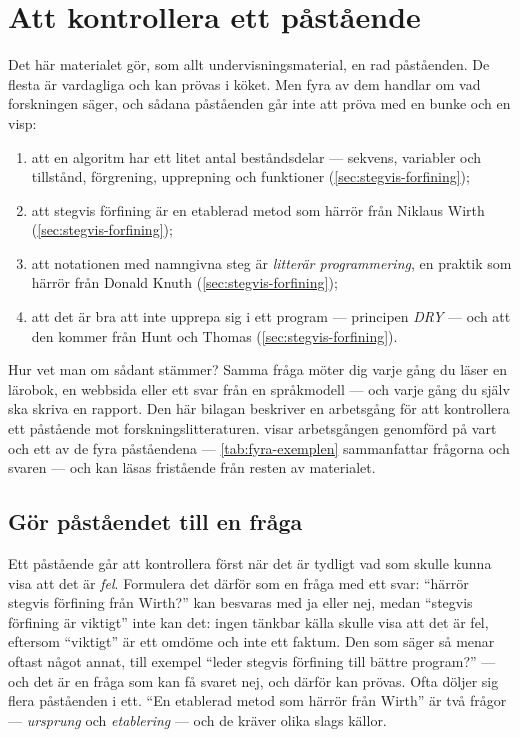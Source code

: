 \chapter{Att kontrollera ett påstående}
\label{app:verifiera-algoritmiskt}

Det här materialet gör, som allt undervisningsmaterial, en rad påståenden.
De flesta är vardagliga och kan prövas i köket.  Men fyra av dem handlar
om vad forskningen säger, och sådana påståenden går inte att pröva med en
bunke och en visp:
\begin{enumerate}
  \item att en algoritm har ett litet antal beståndsdelar --- sekvens,
    variabler och tillstånd, förgrening, upprepning och funktioner
    (\cref{sec:stegvis-forfining});
  \item att stegvis förfining är en etablerad metod som härrör från
    Niklaus Wirth (\cref{sec:stegvis-forfining});
  \item att notationen med namngivna steg är \emph{litterär
    programmering}, en praktik som härrör från Donald Knuth
    (\cref{sec:stegvis-forfining});
  \item att det är bra att inte upprepa sig i ett program --- principen
    \emph{DRY} --- och att den kommer från Hunt och Thomas
    (\cref{sec:stegvis-forfining}).
\end{enumerate}
Hur vet man om sådant stämmer?  Samma fråga möter dig varje gång du läser
en lärobok, en webbsida eller ett svar från en språkmodell --- och varje
gång du själv ska skriva en rapport.  Den här bilagan beskriver en
arbetsgång för att kontrollera ett påstående mot forskningslitteraturen.
visar arbetsgången genomförd på vart och ett av de fyra påståendena ---
\cref{tab:fyra-exemplen} sammanfattar frågorna och svaren --- och kan
läsas fristående från resten av materialet.

\section{Gör påståendet till en fråga}

Ett påstående går att kontrollera först när det är tydligt vad som skulle
kunna visa att det är \emph{fel}.  Formulera det därför som en fråga med
ett svar: \enquote{härrör stegvis förfining från Wirth?} kan besvaras
med ja eller nej, medan \enquote{stegvis förfining är viktigt} inte kan
det: ingen tänkbar källa skulle visa att det är fel, eftersom
\enquote{viktigt} är ett omdöme och inte ett faktum.  Den som säger så
menar oftast något annat, till exempel \enquote{leder stegvis förfining
till bättre program?} --- och det är en fråga som kan få svaret nej, och
därför kan prövas.  Ofta döljer sig flera påståenden i ett.  \enquote{En etablerad metod
som härrör från Wirth} är två frågor --- \emph{ursprung} och
\emph{etablering} --- och de kräver olika slags källor.

